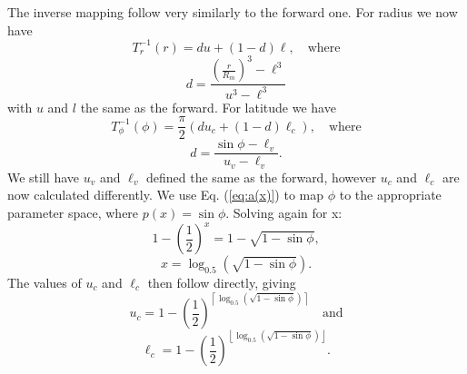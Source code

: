 The inverse mapping follow very similarly to the forward one. For radius we now have
%
\begin{equation*}
T^{-1}_{r}(r) = d u + \left( 1 - d \right) \ell, \quad \text{where}
\end{equation*}
%
\begin{equation*}
d = \frac{ \left( \frac{r}{R_{m}} \right)^{3} - \ell^{3}}{u^{3} - \ell^{3}}
\end{equation*}
%
with $u$ and $l$ the same as the forward. For latitude we have
%
\begin{equation*}
T^{-1}_{\phi}(\phi) = \frac{\pi}{2} \left( d u_{c} + \left( 1 - d \right) \ell_{c} \right), \quad \text{where}
\end{equation*}
%
\begin{equation*}
d = \frac{\sin \phi - \ell_{v}}{u_{v} - \ell_{v}}.
\end{equation*}
%
We still have $u_{v}$ and $\ell_{v}$ defined the same as the forward, however $u_{c}$ and $\ell_{c}$ are now calculated differently. We use Eq. (\ref{eq:a(x)}) to map $\phi$ to the appropriate parameter space, where $p(x) = \sin \phi$. Solving again for x:
%
\begin{equation*}
1 - \left( \frac{1}{2} \right)^{x} = 1 - \sqrt{1 - \sin \phi},
\end{equation*}
%
\begin{equation*}
x = \log_{0.5} \left( \sqrt{1 - \sin \phi} \right).
\end{equation*} 
%
The values of $u_{c}$ and $\ell_{c}$ then follow directly, giving
%
\begin{equation*}
u_{c} = 1 - \left( \frac{1}{2} \right)^{ \left\lceil \log_{0.5} \left( \sqrt{1 - \sin \phi} \right) \right\rceil} \quad \text{and}
\end{equation*}
%
\begin{equation*}
\ell_{c} = 1 - \left( \frac{1}{2} \right)^{ \left\lfloor \log_{0.5} \left( \sqrt{1 - \sin \phi} \right) \right\rfloor}.
\end{equation*}
%